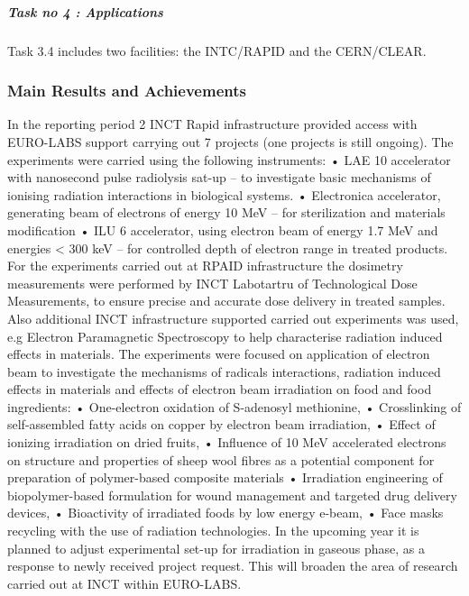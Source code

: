 \subparagraph{Task no 4 : Applications} \mbox{}

Task 3.4 includes two facilities: the INTC/RAPID and the CERN/CLEAR.

\subsubsection*{Main Results and Achievements}



In the reporting period 2 INCT Rapid infrastructure provided access with EURO-LABS support carrying out 7 projects (one projects is still ongoing). The experiments were carried using the following instruments: 
•	LAE 10 accelerator with nanosecond pulse radiolysis sat-up – to investigate basic mechanisms of ionising radiation interactions in biological systems.
•	Electronica accelerator, generating beam of electrons of energy 10 MeV – for sterilization and materials modification
•	ILU 6 accelerator, using electron beam of energy 1.7 MeV and energies < 300 keV – for controlled depth of electron range in treated products.
For the experiments carried out at RPAID infrastructure the dosimetry measurements were performed by INCT Labotartru of Technological Dose Measurements, to ensure precise and accurate dose delivery in treated samples. Also additional INCT infrastructure supported carried out experiments was used, e.g Electron Paramagnetic Spectroscopy to help characterise radiation induced effects in materials.
The experiments were focused on application of electron beam to investigate the mechanisms of radicals interactions, radiation induced effects in materials and effects of electron beam irradiation on food and food ingredients: 
•	One-electron oxidation of S-adenosyl methionine,
•	Crosslinking of self-assembled fatty acids on copper by electron beam irradiation,
•	Effect of ionizing irradiation on dried fruits,
•	Influence of 10 MeV accelerated electrons on structure and properties of sheep wool fibres as a potential component for preparation of polymer-based composite materials
•	Irradiation engineering of biopolymer-based formulation for wound management and targeted drug delivery devices,
•	Bioactivity of irradiated foods by low energy e-beam,
•	Face masks recycling with the use of radiation technologies.
In the upcoming year it is planned to adjust experimental set-up for irradiation in gaseous phase, as a response to newly received project request. This will broaden the area of research carried out at INCT within EURO-LABS.



